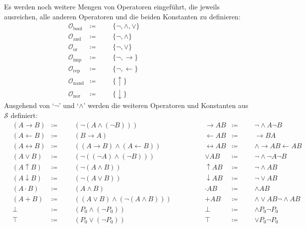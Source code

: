 \documentclass[english,ngerman,parskip=half,headsepline,footsepline,
	fleqn,notitlepage]{scrreprt}
\newcommand*{\defeq}{\coloneqq}%
\newcommand*{\ladd}{+}
\newcommand*{\lmult}{\cdot}
\newcommand*{\ltrue}{\top}%
\newcommand*{\lfalse}{\bot}%
\newcommand*{\lrep}{\leftarrow}%
\newcommand*{\limp}{\rightarrow}%
\newcommand*{\lequiv}{\leftrightarrow}%
\newcommand*{\lnand}{\uparrow}%
\newcommand*{\lnor}{\downarrow}%
\newcommand*{\asS}{\mathcal{S}}%
\newcommand*{\asO}{\mathcal{O}}%
\newcommand*{\asObool}{\asO_\mathrm{bool}}
\newcommand*{\asOand}{\asO_\mathrm{and}}
\newcommand*{\asOor}{\asO_\mathrm{or}}
\newcommand*{\asOimp}{\asO_\mathrm{imp}}
\newcommand*{\asOrep}{\asO_\mathrm{rep}}
\newcommand*{\asOnand}{\asO_\mathrm{nand}}
\newcommand*{\asOnor}{\asO_\mathrm{nor}}
\newcommand*{\formulatoleft}{&&&&&&&&&&}%
\newcommand*{\formulaspace}{&&&&}%
\newcommand*{\charqt}[1]{\enquote*{#1}}%
\newcommand*{\symqt}[1]{\charqt{#1}}%
\begin{document}
	Es werden noch weitere Mengen von Operatoren eingeführt,
	die jeweils ausreichen,
	alle anderen Operatoren und die beiden Konstanten zu definieren:
	\begin{align}
		& \asObool & \defeq & & & \{ \lnot, \land, \lor \} \label{def:Obool} \\
		& \asOand  & \defeq & & & \{ \lnot, \land       \} \label{def:Oand}  \\
		& \asOor   & \defeq & & & \{ \lnot, \lor        \} \label{def:Oor}   \\
		& \asOimp  & \defeq & & & \{ \lnot, \limp       \} \label{def:Oimp}  \\
		& \asOrep  & \defeq & & & \{ \lnot, \lrep       \} \label{def:Orep}  \\
		& \asOnand & \defeq & & & \{ \lnand             \} \label{def:Onand} \\
		& \asOnor  & \defeq & & & \{ \lnor              \} \label{def:Onor}
		\formulatoleft
	\end{align}
	Ausgehend von \symqt{$\lnot$} und \symqt{$\land$}
	werden die weiteren Operatoren und Konstanten aus $\asS$ definiert:
	\begin{align}
		&                 (A \limp B) & \defeq & & & (\lnot (A \land (\lnot B)))
		& \formulaspace &   \limp A B & \defeq & & & \lnot \land A \lnot B
		\label{def:imp}   \\
		&                 (A \lrep B) & \defeq & & & (B \limp A)
		& \formulaspace &   \lrep A B & \defeq & & & \limp B A
		\label{def:rep}   \\
		&               (A \lequiv B) & \defeq & & & ((A\limp B)\land(A\lrep B))
		& \formulaspace & \lequiv A B & \defeq & & & \land \limp A B \lrep A B
		\label{def:equiv} \\
		&             (A \lor B) & \defeq & & & (\lnot((\lnot A)\land(\lnot B)))
		& \formulaspace &    \lor A B & \defeq & & & \lnot \land \lnot A \lnot B
		\label{def:or}    \\
		&                (A \lnand B) & \defeq & & & (\lnot (A \land B ))
		& \formulaspace &  \lnand A B & \defeq & & & \lnot \land A B
		\label{def:nand}  \\
		&                 (A \lnor B) & \defeq & & & (\lnot (A \lor B))
		& \formulaspace &   \lnor A B & \defeq & & & \lnot \lor A B
		\label{def:nor}   \\
		&                (A \lmult B) & \defeq & & & (A \land B)
		& \formulaspace &  \lmult A B & \defeq & & & \land A B
		\label{def:mult}  \\
		&           (A \ladd B) & \defeq & & & ((A\lor B)\land(\lnot(A\land B)))
		& \formulaspace &   \ladd A B & \defeq & & & \land\lor A B\lnot\land A B
		\label{def:add}   \\
		&                     \lfalse & \defeq & & & (P_0 \land (\lnot P_0))
		& \formulaspace &     \lfalse & \defeq & & & \land P_0 \lnot P_0
		\label{def:false} \\
		&                      \ltrue & \defeq & & & (P_0 \lor (\lnot P_0))
		& \formulaspace &      \ltrue & \defeq & & & \lor P_0 \lnot P_0
		\label{def:true}  \formulatoleft
	\end{align}
\end{document}
